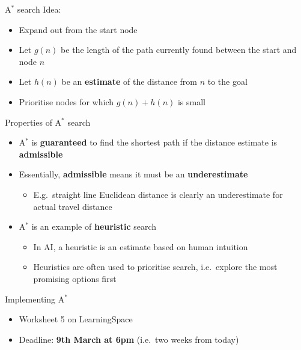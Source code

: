 \begin{frame}{A$^*$ search}
    Idea:
    \begin{itemize}
        \item Expand out from the start node
        \item Let $g(n)$ be the length of the path currently found between the start and node $n$
        \item Let $h(n)$ be an \textbf{estimate} of the distance from $n$ to the goal
        \item Prioritise nodes for which $g(n) + h(n)$ is small
    \end{itemize}
\end{frame}

\begin{frame}{Properties of A$^*$ search}
    \begin{itemize}
        \item A$^*$ is \textbf{guaranteed} to find the shortest path
            if the distance estimate is \textbf{admissible}
        \item Essentially, \textbf{admissible} means it must be an \textbf{underestimate}
            \begin{itemize}
                \item E.g.\ straight line Euclidean distance is clearly an underestimate
                    for actual travel distance
            \end{itemize}
        \item A$^*$ is an example of \textbf{heuristic} search
            \begin{itemize}
                \item In AI, a heuristic is an estimate based on human intuition
                \item Heuristics are often used to prioritise search,
                    i.e.\ explore the most promising options first
            \end{itemize}
    \end{itemize}
\end{frame}

\begin{frame}{Implementing A$^*$}
    \begin{itemize}
        \item Worksheet 5 on LearningSpace
        \item Deadline: \textbf{9th March at 6pm} (i.e.\ two weeks from today)
    \end{itemize}
\end{frame}

